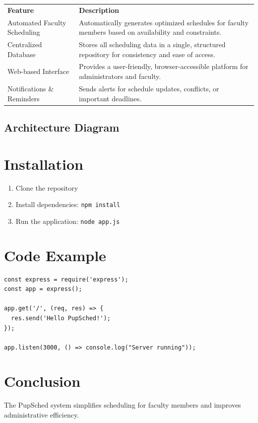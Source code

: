 \documentclass[12pt,letterpaper]{article}
\begin{document}
\begin{tcolorbox}[
  colback=blue!1,        %
  colframe=gray!40,      %
  boxrule=0.5pt, 
  arc=4pt,               %
  boxsep=6pt,            %
  left=0pt, right=0pt, 
  top=6pt, bottom=6pt,
  fontupper=\sffamily,   %
  title=, 
  coltitle=blue!70!black,
  fonttitle=\sffamily\bfseries
]
\renewcommand{\arraystretch}{1.5} %
\begin{tabular}{>{\centering\arraybackslash}p{5cm}|>{\centering\arraybackslash}p{10cm}}
\rowcolor{gray!20} \textbf{Feature} & \textbf{Description} \\

Automated Faculty Scheduling & Automatically generates optimized schedules for faculty members based on availability and constraints. \\
Centralized Database & Stores all scheduling data in a single, structured repository for consistency and ease of access. \\
Web-based Interface & Provides a user-friendly, browser-accessible platform for administrators and faculty. \\
Notifications \& Reminders & Sends alerts for schedule updates, conflicts, or important deadlines. \\
\end{tabular}
\end{tcolorbox}



\subsection{Architecture Diagram}
\begin{center}
\end{center}

\section{Installation}
\begin{enumerate}
    \item Clone the repository
    \item Install dependencies: \texttt{npm install}
    \item Run the application: \texttt{node app.js}
\end{enumerate}

\section{Code Example}
\begin{lstlisting}[caption={Sample Node.js Code}]
const express = require('express');
const app = express();

app.get('/', (req, res) => {
  res.send('Hello PupSched!');
});

app.listen(3000, () => console.log("Server running"));
\end{lstlisting}

\section{Conclusion}
The PupSched system simplifies scheduling for faculty members and improves administrative efficiency.
\end{document}

